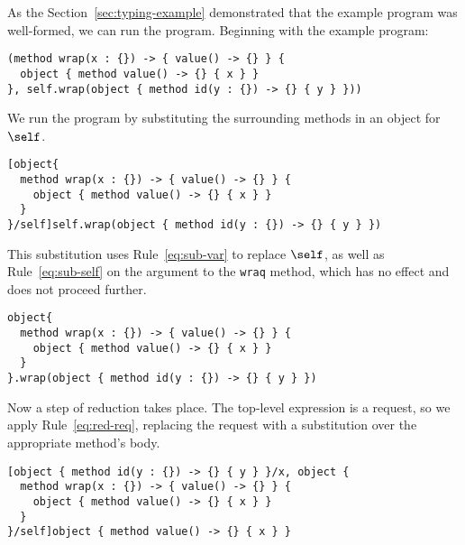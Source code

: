 \begin{scope}
  \def\ov{\overset{v}{\O}}
  \def\oid{\overset{id}{\O}}

  \def\x{\mlst{x}}
  \def\y{\mlst{y}}

  \def\vtype{\type{\head{value}{}{}}}
  \def\wrap{\method{\mlst{wrap}}{\x : \type{}}{\vtype}{\ov}}
  \def\mid{\method{\mlst{id}}{\y : \type{}}{\type{}}{\x}}
  \def\exp{\self.\mlst{wrap}\text{\po}\oid\text{\pc}}

  As the Section~\ref{sec:typing-example} demonstrated that the example program
  was well-formed, we can run the program. Beginning with the example program:

  \begin{lstlisting}
(method wrap(x : {}) -> { value() -> {} } {
  object { method value() -> {} { x } }
}, self.wrap(object { method id(y : {}) -> {} { y } }))
  \end{lstlisting}

  \noindent We run the program by substituting the surrounding methods in an
  object for $\self$.

  \begin{lstlisting}
[object{
  method wrap(x : {}) -> { value() -> {} } {
    object { method value() -> {} { x } }
  }
}/self]self.wrap(object { method id(y : {}) -> {} { y } })
  \end{lstlisting}

  \noindent This substitution uses Rule~\ref{eq:sub-var} to replace $\self$, as
  well as Rule~\ref{eq:sub-self} on the argument to the \lstinline{wraq} method,
  which has no effect and does not proceed further.

  \begin{lstlisting}
object{
  method wrap(x : {}) -> { value() -> {} } {
    object { method value() -> {} { x } }
  }
}.wrap(object { method id(y : {}) -> {} { y } })
  \end{lstlisting}

  \noindent Now a step of reduction takes place.  The top-level expression is a
  request, so we apply Rule~\ref{eq:red-req}, replacing the request with a
  substitution over the appropriate method's body.

  \begin{lstlisting}
[object { method id(y : {}) -> {} { y } }/x, object {
  method wrap(x : {}) -> { value() -> {} } {
    object { method value() -> {} { x } }
  }
}/self]object { method value() -> {} { x } }
  \end{lstlisting}


\end{scope}
